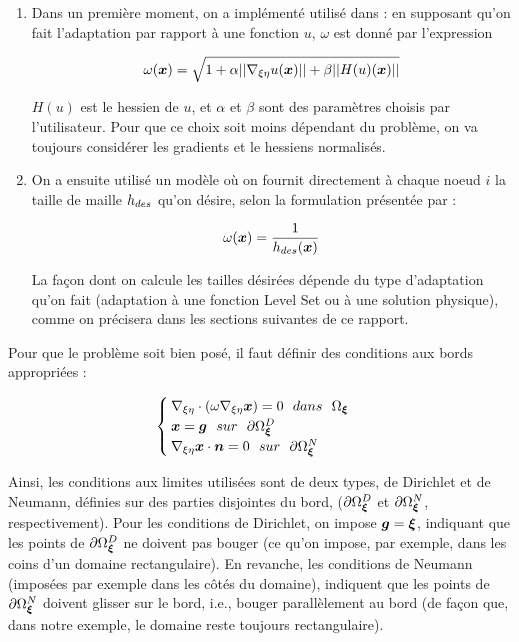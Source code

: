 \begin{enumerate}
	\item Dans un première moment, on a implémenté utilisé dans \cite{arpaia} : en supposant qu'on fait l'adaptation par rapport à une fonction \(u\), \(\omega\) est donné par l'expression

	\begin{equation*}
  		\omega(\boldsymbol{x}) = \sqrt{1 + \alpha ||\nabla_{\xi\eta} u(\boldsymbol{x})|| + \beta ||H(u)(\boldsymbol{x})||}
	\end{equation*}

	\indent \(H(u)\) est le hessien de \(u\), et \(\alpha\) et \(\beta\) sont des paramètres choisis par l'utilisateur. Pour que ce choix soit moins dépendant du problème, on va toujours considérer les gradients et le hessiens normalisés.
	
	\item On a ensuite utilisé un modèle où on fournit directement à chaque noeud \(i\) la taille de maille \(h_{des}\) qu'on désire, selon la formulation présentée par \cite{askes} : 
	
	\begin{equation}
		\label{eq:omega2}
		\omega(\boldsymbol{x}) = \frac{1}{h_{des}(\boldsymbol{x})}
	\end{equation}
	
	\indent La façon dont on calcule les tailles désirées dépende du type d'adaptation qu'on fait (adaptation à une fonction Level Set ou à une solution physique), comme on précisera dans les sections suivantes de ce rapport.
	
	
\end{enumerate} 

\indent Pour que le problème soit bien posé, il faut définir des conditions aux bords appropriées : 

\begin{equation}
	\label{eq:systeme}
	\begin{cases}
  		\nabref \cdot \left( \omega \nabref \vecx \right) = 0 \ \ dans \ \ \domRef \\
  		\vecx = \vecg \ \ sur \ \ \bordRef^D \\
  		\nabref \vecx \cdot \vecn = 0 \ \ sur \ \ \bordRef^N 
	\end{cases}
\end{equation}

\indent Ainsi, les conditions aux limites utilisées sont de deux types, de Dirichlet et de Neumann, définies sur des parties disjointes du bord, (\(\partial \Omega_{\boldsymbol{\xi}}^D\) et \(\partial \Omega_{\boldsymbol{\xi}}^N\), respectivement). Pour les conditions de Dirichlet, on impose \(\boldsymbol{g} = \boldsymbol{\xi}\), indiquant que les points de \(\partial \Omega_{\boldsymbol{\xi}}^D\) ne doivent pas bouger (ce qu'on impose, par exemple, dans les coins d'un domaine rectangulaire). En revanche, les conditions de Neumann (imposées par exemple dans les côtés du domaine), indiquent que les points de \(\partial \Omega_{\boldsymbol{\xi}}^N\) doivent glisser sur le bord, i.e., bouger parallèlement  au bord (de façon que, dans notre exemple, le domaine reste toujours rectangulaire).

